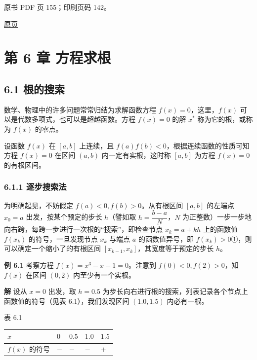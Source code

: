 \clearpage

原书 PDF 页 155；印刷页码 142。

\href{source-images/pdf-155.jpeg}{原页}

\section{第 6 章 方程求根}\label{ch06-ux7b2c-6-ux7ae0-ux65b9ux7a0bux6c42ux6839}

\subsection{6.1 根的搜索}\label{ch06-ux6839ux7684ux641cux7d22}

数学、物理中的许多问题常常归结为求解函数方程 \(f(x)=0\)，这里，\(f(x)\) 可以是代数多项式，也可以是超越函数。方程 \(f(x)=0\) 的解 \(x^*\) 称为它的根，或称为 \(f(x)\) 的零点。

设函数 \(f(x)\) 在 \([a,b]\) 上连续，且 \(f(a)f(b)<0\)，根据连续函数的性质可知方程 \(f(x)=0\) 在区间 \((a,b)\) 内一定有实根，这时称 \([a,b]\) 为方程 \(f(x)=0\) 的有根区间。

\subsubsection{6.1.1 逐步搜索法}\label{ch06-ux9010ux6b65ux641cux7d22ux6cd5}

为明确起见，不妨假定 \(f(a)<0,f(b)>0\)。从有根区间 \([a,b]\) 的左端点 \(x_0=a\) 出发，按某个预定的步长 \(h\)（譬如取 \(h=\dfrac{b-a}{N}\)，\(N\) 为正整数）一步一步地向右跨，每跨一步进行一次根的``搜索''，即检查节点 \(x_k=a+kh\) 上的函数值 \(f(x_k)\) 的符号，一旦发现节点 \(x_k\) 与端点 \(a\) 的函数值异号，即 \(f(x_k)>0\)①，则可以确定一个缩小了的有根区间 \([x_{k-1},x_k]\)，其宽度等于预定的步长 \(h\)。

\textbf{例 6.1} 考察方程 \(f(x)=x^3-x-1=0\)。注意到 \(f(0)<0,f(2)>0\)，知 \(f(x)\) 在区间 \((0,2)\) 内至少有一个实根。

\textbf{解} 设从 \(x=0\) 出发，取 \(h=0.5\) 为步长向右进行根的搜索，列表记录各个节点上函数值的符号（见表 6.1），我们发现区间 \((1.0,1.5)\) 内必有一根。

表 6.1

{\def\LTcaptype{none} %
\begin{longtable}[]{@{}lllll@{}}
\toprule\noalign{}
\(x\) & \(0\) & \(0.5\) & \(1.0\) & \(1.5\) \\
\midrule\noalign{}
\endhead
\bottomrule\noalign{}
\endlastfoot
\(f(x)\) 的符号 & \(-\) & \(-\) & \(-\) & \(+\) \\
\end{longtable}
}

